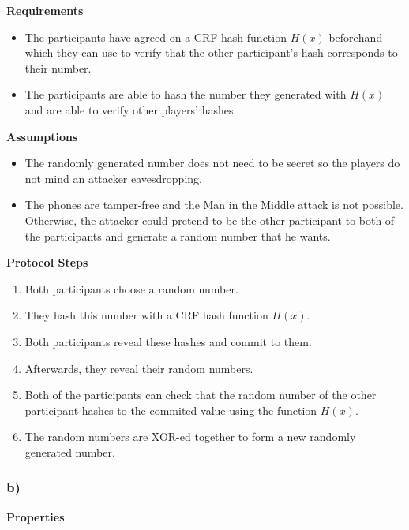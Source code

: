 \documentclass{article}
\begin{document}
\textbf{Requirements}

\begin{itemize}
\itemsep1pt\parskip0pt
\item
  The participants have agreed on a CRF hash function $H(x)$ beforehand
  which they can use to verify that the other participant's hash
  corresponds to their number.
\item
  The participants are able to hash the number they generated with
  $H(x)$ and are able to verify other players' hashes.
\end{itemize}

\textbf{Assumptions}

\begin{itemize}
\itemsep1pt\parskip0pt
\item
  The randomly generated number does not need to be secret so the
  players do not mind an attacker eavesdropping.
\item
  The phones are tamper-free and the Man in the Middle attack is not
  possible. Otherwise, the attacker could pretend to be the other
  participant to both of the participants and generate a random number
  that he wants.
\end{itemize}

\textbf{Protocol Steps}

\begin{enumerate}
\def\labelenumi{\arabic{enumi}.}
\itemsep1pt\parskip0pt
\item
  Both participants choose a random number.
\item
  They hash this number with a CRF hash function $H(x)$.
\item
  Both participants reveal these hashes and commit to them.
\item
  Afterwards, they reveal their random numbers.
\item
  Both of the participants can check that the random number of the other
  participant hashes to the commited value using the function $H(x)$.
\item
  The random numbers are XOR-ed together to form a new randomly
  generated number.
\end{enumerate}

    \subsubsection{b)}\label{b}

\textbf{Properties}
\end{document}
